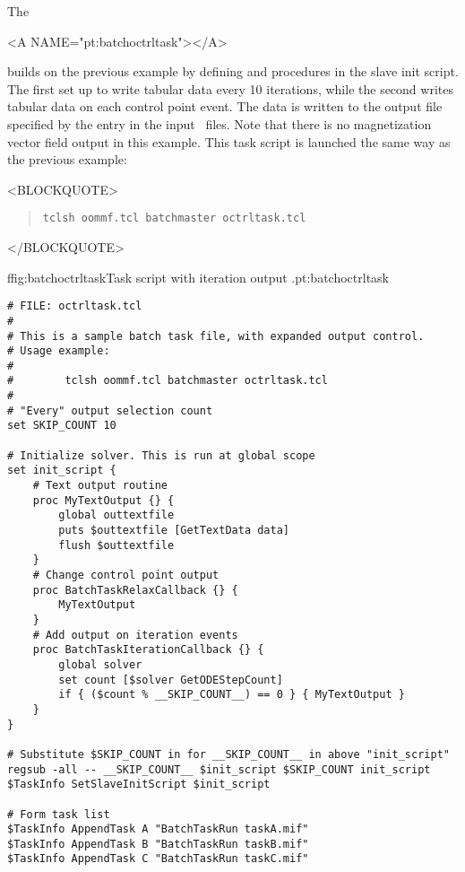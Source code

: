 The\begin{rawhtml}
<A NAME="pt:batchoctrltask"></A>
\end{rawhtml}
 builds on the previous example by
defining  and
 procedures in the slave init script.
The first set up to write tabular data every 10 iterations, while the
second writes tabular data on each control point event.  The data is
written to the output file specified by the 
entry in the input \MIF\ files.  Note that there is no magnetization
vector field output in this example.  This task script is launched the
same way as the previous example:
\begin{rawhtml}<BLOCKQUOTE>\end{rawhtml}
\begin{quote}
\begin{verbatim}
tclsh oommf.tcl batchmaster octrltask.tcl
\end{verbatim}
\end{quote}
\begin{rawhtml}</BLOCKQUOTE>\end{rawhtml}

\begin{codelisting}{f}{fig:batchoctrltask}{Task script with
iteration output .}{pt:batchoctrltask}
\begin{verbatim}
# FILE: octrltask.tcl
#
# This is a sample batch task file, with expanded output control.
# Usage example:
#
#        tclsh oommf.tcl batchmaster octrltask.tcl
#
# "Every" output selection count
set SKIP_COUNT 10

# Initialize solver. This is run at global scope
set init_script {
    # Text output routine
    proc MyTextOutput {} {
        global outtextfile
        puts $outtextfile [GetTextData data]
        flush $outtextfile
    }
    # Change control point output
    proc BatchTaskRelaxCallback {} {
        MyTextOutput
    }
    # Add output on iteration events
    proc BatchTaskIterationCallback {} {
        global solver
        set count [$solver GetODEStepCount]
        if { ($count % __SKIP_COUNT__) == 0 } { MyTextOutput }
    }
}

# Substitute $SKIP_COUNT in for __SKIP_COUNT__ in above "init_script"
regsub -all -- __SKIP_COUNT__ $init_script $SKIP_COUNT init_script
$TaskInfo SetSlaveInitScript $init_script

# Form task list
$TaskInfo AppendTask A "BatchTaskRun taskA.mif"
$TaskInfo AppendTask B "BatchTaskRun taskB.mif"
$TaskInfo AppendTask C "BatchTaskRun taskC.mif"
\end{verbatim}
\end{codelisting}

